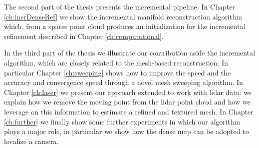 The second part of the thesis presents the incremental pipeline. 
In Chapter \ref{ch:incrDenseRef} we show the incremental manifold reconstruction algorithm which, from a sparse point cloud produces an initialization for the incremental refinement described in  Chapter \ref{ch:computational}.

In the third part of the thesis we illustrate our contribution aside the incremental algorithm, which are closely related to the mesh-based reconstruction.
In particular Chapter \ref{ch:sweeping} shows how to improve the speed and the accuracy and convergence speed through a novel mesh sweeping algorithm.
In Chapter \ref{ch:laser} we present our approach extended to work with lidar data: we explain how we remove the moving point from the lidar point cloud and how we leverage on this information to estimate a refined and textured mesh.
In Chapter \ref{ch:further} we finally show some further experiments in which our algorithm plays a major role, in particular we show how the dense map can be adopted to localize a camera.














